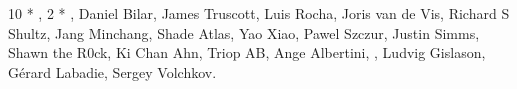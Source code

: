 ﻿\subsubsection*{}

10 * , 2 * , Daniel Bilar, James Truscott,
Luis Rocha, Joris van de Vis, Richard S Shultz, Jang Minchang, Shade Atlas, Yao Xiao,
Pawel Szczur, Justin Simms, Shawn the R0ck, Ki Chan Ahn, Triop AB, Ange Albertini,
, Ludvig Gislason, Gérard Labadie, Sergey Volchkov.
